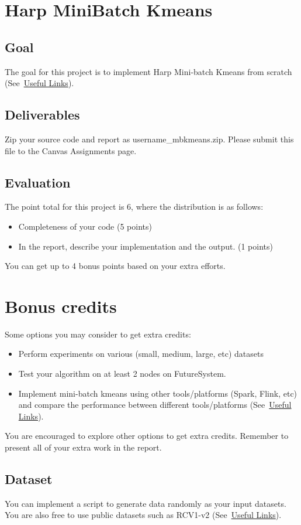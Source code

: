 \section*{Harp Mini\-Batch Kmeans}
\subsection*{Goal}
The goal for this project is to implement Harp Mini-batch Kmeans
from scratch (See~\hyperlink{link_project8}{Useful Links}). 

\subsection*{Deliverables}
Zip your source code and report as username\_mbkmeans.zip. Please submit this
file to the Canvas Assignments page.

\subsection*{Evaluation}

The point total for this project is 6, where the distribution is as follows:
\begin{itemize}
\item Completeness of your code (5 points)
\item In the report, describe your implementation and the output. (1 points)
\end{itemize}
 You can get up to 4 bonus points based on your  extra efforts.
\section*{Bonus credits}

Some options you may consider to get extra credits: 
\begin{itemize}
\item Perform experiments on various (small, medium, large, etc) datasets 
\item Test your algorithm on at least 2 nodes on FutureSystem.
\item Implement mini-batch kmeans using other tools/platforms
  (Spark, Flink, etc) and compare the performance between different
    tools/platforms (See~\hyperlink{link_project8}{Useful Links}).
\end{itemize}
You are encouraged to explore other options to get extra credits. Remember to
present all of your extra work in the report.
 
\subsection*{Dataset}
You can implement a script to  generate data randomly as your input datasets.
You are also free to use public datasets such as RCV1-v2
(See~\hyperlink{link_project8}{Useful Links}).
  
